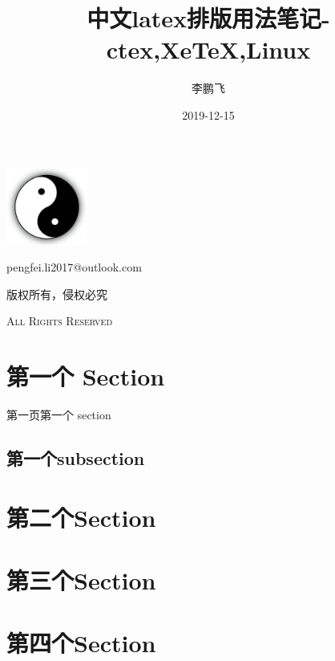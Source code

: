 \documentclass[UTF8,fancyhdr,a4paper]{ctexart}
\title{中文latex排版用法笔记-ctex,XeTeX,Linux}
\author{李鹏飞}
\date{2019-12-15}
\begin{document}
\begin{titlepage}
\maketitle
{}
\centering
\vspace{10cm}
\includegraphics[width = 0.2\textwidth]{YinYang.jpg}\par
\vspace{1cm}
{\huge pengfei.li2017@outlook.com}\par
\vspace{0.5cm}
{\small 版权所有，侵权必究}\par
\vspace{0.5cm}
{\scshape \small All Rights Reserved}
\end{titlepage}
\tableofcontents
{}
\clearpage
\listoffigures
{}
\clearpage
\listoftables
{}


\newpage
{}
\section{第一个 Section}
第一页第一个 section
\subsection{第一个subsection}

\newpage
\section{第二个Section}

\newpage
\section{第三个Section}

\newpage
\section{第四个Section}
\end{document}

